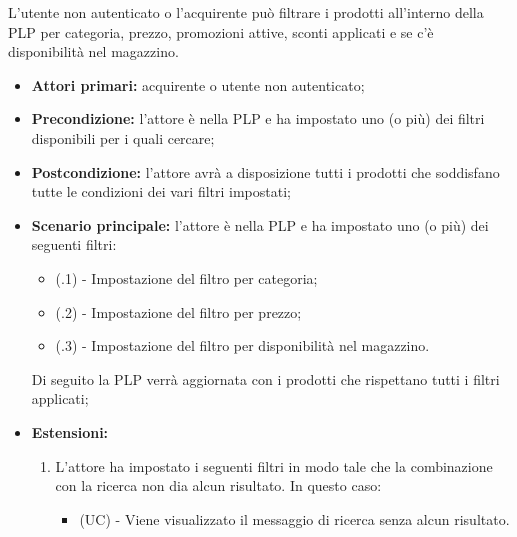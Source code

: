 L'utente non autenticato o l'acquirente può filtrare i prodotti all'interno della PLP per categoria, prezzo, promozioni attive, sconti applicati e se c'è disponibilità nel magazzino.
\begin{itemize}
    \item \textbf{Attori primari:} acquirente o utente non autenticato;
    \item \textbf{Precondizione:} l'attore è nella PLP e ha impostato uno (o più) dei filtri disponibili per i quali cercare;
    \item \textbf{Postcondizione:} l'attore avrà a disposizione tutti i prodotti che soddisfano tutte le condizioni dei vari filtri impostati;
    \item \textbf{Scenario principale:} l'attore è nella PLP e ha impostato uno (o più) dei seguenti filtri:
    \begin{itemize}
        \item (\actualUC.1) - Impostazione del filtro per categoria;
        \item (\actualUC.2) - Impostazione del filtro per prezzo;
        \item (\actualUC.3) - Impostazione del filtro per disponibilità nel magazzino.
    \end{itemize}
    Di seguito la PLP verrà aggiornata con i prodotti che rispettano tutti i filtri applicati;
    \item \textbf{Estensioni:}
    \begin{enumerate}[label=\lett]
        \item L'attore ha impostato i seguenti filtri in modo tale che la combinazione con la ricerca non dia alcun risultato. In questo caso:
        \begin{itemize}
            \item (UC) - Viene visualizzato il messaggio di ricerca senza alcun risultato.
        \end{itemize}
    \end{enumerate}
\end{itemize}

\resetSubUC


